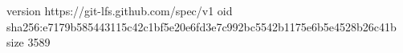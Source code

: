 version https://git-lfs.github.com/spec/v1
oid sha256:e7179b585443115c42c1bf5e20e6fd3e7c992bc5542b1175e6b5e4528b26c41b
size 3589
